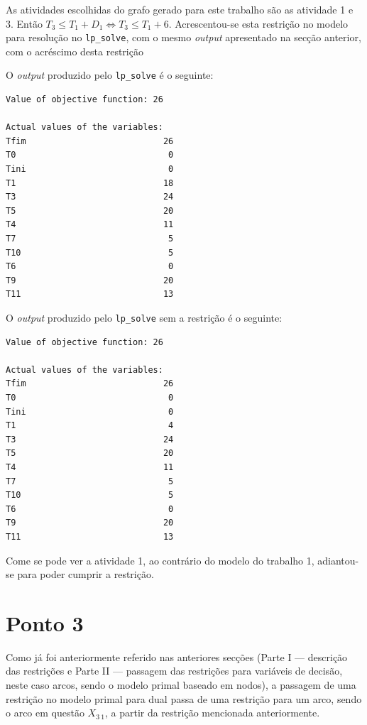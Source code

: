 As atividades escolhidas do grafo gerado para este trabalho são as atividade
1 e 3. Então $T_3 \le T_1 + D_1 \Leftrightarrow T_3 \le T_1 + 6$. Acrescentou-se
esta restrição no modelo para resolução no \texttt{lp\_solve}, com o mesmo
\emph{output} apresentado na secção anterior, com o acréscimo desta restrição

\newpage

O \emph{output} produzido pelo \texttt{lp\_solve} é o seguinte:

\begin{verbatim}
Value of objective function: 26

Actual values of the variables:
Tfim                           26
T0                              0
Tini                            0
T1                             18
T3                             24
T5                             20
T4                             11
T7                              5
T10                             5
T6                              0
T9                             20
T11                            13

\end{verbatim}


O \emph{output} produzido pelo \texttt{lp\_solve} sem a restrição é o seguinte:

\begin{verbatim}
Value of objective function: 26

Actual values of the variables:
Tfim                           26
T0                              0
Tini                            0
T1                              4
T3                             24
T5                             20
T4                             11
T7                              5
T10                             5
T6                              0
T9                             20
T11                            13

\end{verbatim}

Come se pode ver a atividade 1, ao contrário do modelo do trabalho 1,
adiantou-se para poder cumprir a restrição.


\section{Ponto 3}

Como já foi anteriormente referido nas anteriores secções (Parte I --- descrição
das restrições e Parte II --- passagem das restrições para variáveis de decisão,
neste caso arcos, sendo o modelo primal baseado em nodos), a passagem de uma
restrição no modelo primal para dual passa de uma restrição para um arco, sendo
o arco em questão $X_{3~1}$, a partir da restrição mencionada anteriormente.


